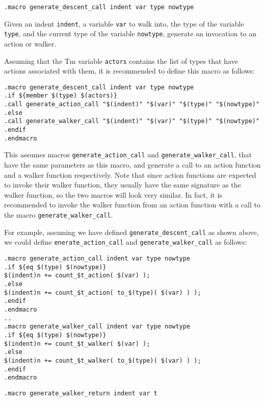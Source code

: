 \begin{verbatim}
.macro generate_descent_call indent var type nowtype
\end{verbatim}
\begin{desc}
Given an indent \verb'indent', a variable \verb'var' to walk into, the
type of the variable \verb'type', and the current type of the variable
\verb'nowtype', generate an invocation to an action or walker.
\par
Assuming that the Tm variable \verb'actors' contains the list of types
that have actions associated with them, it is recommended to define
this macro as follows:
\begin{verbatim}
.macro generate_descent_call indent var type nowtype
.if ${member $(type) $(actors)}
.call generate_action_call "$(indent)" "$(var)" "$(type)" "$(nowtype)"
.else
.call generate_walker_call "$(indent)" "$(var)" "$(type)" "$(nowtype)"
.endif
.endmacro
\end{verbatim}
\begin{sloppypar}
This assumes macros \verb'generate_action_call' and
\verb'generate_walker_call', that have the same parameters as this
macro, and generate a call to an action function and a walker function
respectively. Note that since action functions are expected to invoke
their walker function, they usually have the same signature as the
walker function, so the two macros will look very similar.  In fact,
it is recommended to invoke the walker function from an action function
with a call to the macro \verb'generate_walker_call'.
\end{sloppypar}
\par
For example, assuming we have defined \verb'generate_descent_call' as
shown above, we could define \verb'enerate_action_call' and
\verb'generate_walker_call' as follows:
\begin{verbatim}
.macro generate_action_call indent var type nowtype
.if ${eq $(type) $(nowtype)}
$(indent)n += count_$t_action( $(var) );
.else
$(indent)n += count_$t_action( to_$(type)( $(var) ) );
.endif
.endmacro
..
.macro generate_walker_call indent var type nowtype
.if ${eq $(type) $(nowtype)}
$(indent)n += count_$t_walker( $(var) );
.else
$(indent)n += count_$t_walker( to_$(type)( $(var) ) );
.endif
.endmacro
\end{verbatim}
\end{desc}
\begin{verbatim}
.macro generate_walker_return indent var t
\end{verbatim}
